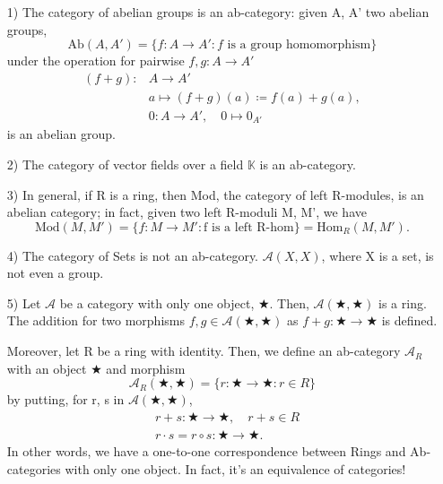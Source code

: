 \documentclass[../category_theory.tex]{subfiles}
\begin{document}
\begin{example}
	\begin{itemize}
		\item[1)] The category of abelian groups is an ab-category: given A, A' two abelian groups,
		      \[
			      \mathrm{Ab}(A, A')=\{f:A\rightarrow A': f \text{ is a group homomorphism}\}
		      \]
		      under the operation for pairwise \(f, g:A\rightarrow A'\)
		      \begin{align*}
			      (f+g): & A\rightarrow A'                         \\
			             & a\mapsto (f+g)(a)\coloneqq f(a)+g(a),   \\
			             & 0:A\rightarrow A',\quad 0\mapsto 0_{A'}
		      \end{align*}
		      is an abelian group.
		\item[2)] The category of vector fields over a field \(\mathbb{K}\) is an ab-category.
		\item[3)] In general, if R is a ring, then Mod, the category of left R-modules, is an abelian category; in fact, given two left R-moduli M, M', we have
		      \[
			      \mathrm{Mod}(M, M')=\{f:M\rightarrow M': \text{f is a left R-hom}\} = \mathrm{Hom}_{R}(M, M').
		      \]
		\item[4)] The category of Sets is not an ab-category. \(\mathcal{A}(X, X)\), where X is a set, is not even a group.
		\item[5)] Let \(\mathcal{A}\) be a category with only one object, \(\bigstar\). Then, \(\mathcal{A}(\bigstar, \bigstar)\) is a ring. The addition for two morphisms \(f, g\in \mathcal{A}(\bigstar, \bigstar)\) as \(f+g:\bigstar\rightarrow \bigstar\) is defined.

		      Moreover, let R be a ring with identity. Then, we define an ab-category \(\mathcal{A}_{R}\) with an object \(\bigstar\) and morphism
		      \[
			      \mathcal{A}_{R}(\bigstar, \bigstar)=\{r:\bigstar\rightarrow \bigstar: r\in R\}
		      \]
		      by putting, for r, s in \(\mathcal{A}(\bigstar, \bigstar)\),
		      \begin{align*}
			       & r+s:\bigstar\rightarrow \bigstar,\quad r+s\in R   \\
			       & r \cdot s= r\circ s:\bigstar\rightarrow \bigstar.
		      \end{align*}
		      In other words, we have a one-to-one correspondence between Rings and Ab-categories with only one object. In fact, it's an equivalence of categories!
	\end{itemize}
\end{example}
\end{document}

